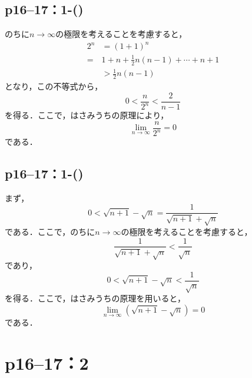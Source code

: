 \subsection*{p16--17：1-()}
\begin{tleftbar}
    のちに$n \to \infty$の極限を考えることを考慮すると，
    \begin{align*}
        2^n & = (1+1)^n                            \\
        =   & 1+n +\frac{1}{2} n(n-1)+ \cdots +n+1 \\
            & > \frac{1}{2} n(n-1)
    \end{align*}
    となり，この不等式から，
    \[
        0< \frac{n}{2^n} < \frac{2}{n-1}
    \]
    を得る．ここで，はさみうちの原理により，
    \[
        \lim_{n \to \infty} \frac{n}{2^n}=0
    \]
    である．
\end{tleftbar}

\subsection*{p16--17：1-()}
\begin{tleftbar}
    まず，
    \[
        0<\sqrt{n+1} - \sqrt{n} = \frac{1}{\sqrt{n+1} + \sqrt{n}}
    \]
    である．ここで，のちに$n \to \infty$の極限を考えることを考慮すると，
    \[
        \frac{1}{\sqrt{n+1} + \sqrt{n}} < \frac{1}{\sqrt{n}}
    \]
    であり，
    \[
        0< \sqrt{n+1} - \sqrt{n} <\frac{1}{\sqrt{n}}
    \]
    を得る．ここで，はさみうちの原理を用いると，
    \[
        \lim_{n \to \infty} (\sqrt{n+1} - \sqrt{n} )=0
    \]
    である．
\end{tleftbar}

\section*{p16--17：2}

